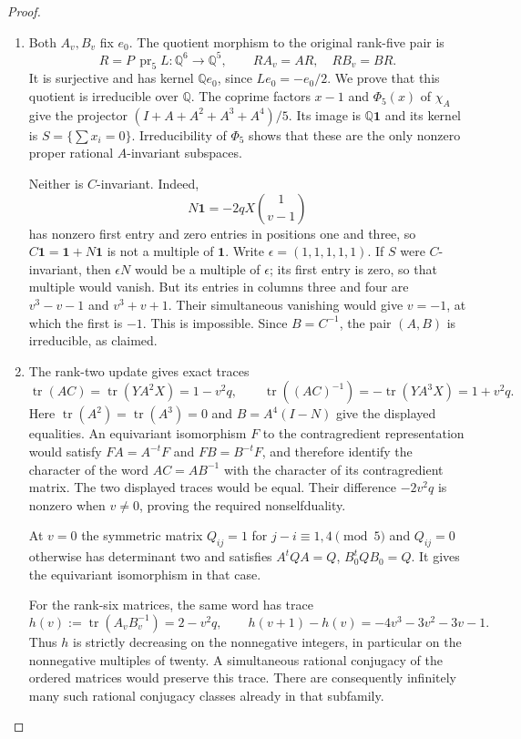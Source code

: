 \begin{proof}
\begin{enumerate}[label={$\langle1\rangle$\arabic*.}]
\item Both $A_v,B_v$ fix $e_0$. The quotient morphism to
the original rank-five pair is
\[
 R=P\,\operatorname{pr}_5 L:\mathbb Q^6\longrightarrow\mathbb Q^5,
 \qquad RA_v=AR,\quad RB_v=BR.
\]
It is surjective and has kernel $\mathbb Qe_0$, since
$Le_0=-e_0/2$. We prove that this quotient is irreducible over
$\mathbb Q$. The coprime factors $x-1$ and $\Phi_5(x)$ of
$\chi_A$ give the projector
$(I+A+A^2+A^3+A^4)/5$. Its image is $\mathbb Q\mathbf1$ and
its kernel is $S=\{\sum x_i=0\}$. Irreducibility of $\Phi_5$
shows that these are the only nonzero proper rational
$A$-invariant subspaces.

Neither is $C$-invariant. Indeed,
\[
 N\mathbf1=-2qX\binom{1}{v-1}
\]
has nonzero first entry and zero entries in positions one and three,
so $C\mathbf1=\mathbf1+N\mathbf1$ is not a multiple of
$\mathbf1$. Write $\epsilon=(1,1,1,1,1)$. If $S$ were
$C$-invariant, then $\epsilon N$ would be a multiple of
$\epsilon$; its first entry is zero, so that multiple would
vanish. But its entries in columns three and four are
$v^3-v-1$ and $v^3+v+1$. Their simultaneous vanishing would
give $v=-1$, at which the first is $-1$. This is impossible.
Since $B=C^{-1}$, the pair $(A,B)$ is irreducible, as claimed.

\item The rank-two update gives exact traces
\[
 \operatorname{tr}(AC)=\operatorname{tr}(YA^2X)=1-v^2q,
 \qquad
 \operatorname{tr}((AC)^{-1})
       =-\operatorname{tr}(YA^3X)=1+v^2q.
\]
Here $\operatorname{tr}(A^2)=\operatorname{tr}(A^3)=0$ and
$B=A^4(I-N)$ give the displayed equalities. An equivariant
isomorphism $F$ to the contragredient representation would
satisfy $FA=A^{-t}F$ and $FB=B^{-t}F$, and therefore identify
the character of the word $AC=AB^{-1}$ with the character
of its contragredient matrix. The two displayed traces would
be equal. Their difference $-2v^2q$ is nonzero when $v\ne0$,
proving the required nonselfduality.

At $v=0$ the symmetric matrix
$Q_{ij}=1$ for $j-i\equiv1,4\pmod5$ and $Q_{ij}=0$ otherwise
has determinant two and satisfies $A^tQA=Q$, $B_0^tQB_0=Q$.
It gives the equivariant isomorphism in that case.

For the rank-six matrices, the same word has trace
\[
 h(v):=\operatorname{tr}(A_vB_v^{-1})=2-v^2q,
 \qquad h(v+1)-h(v)=-4v^3-3v^2-3v-1.
\]
Thus $h$ is strictly decreasing on the nonnegative integers,
in particular on the nonnegative multiples of twenty.
A simultaneous rational conjugacy of the ordered matrices
would preserve this trace. There are consequently infinitely
many such rational conjugacy classes already in that subfamily.


\end{enumerate}
\end{proof}
